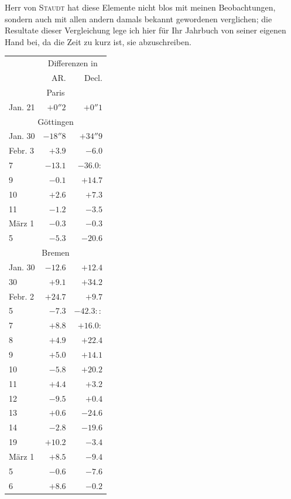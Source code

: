 Herr von \textsc{Staudt} hat diese Elemente nicht blos mit meinen Beobachtungen, sondern auch mit allen andern damals bekannt gewordenen verglichen; die Resultate dieser Vergleichung lege ich hier für Ihr Jahrbuch von seiner eigenen Hand bei, da die Zeit zu kurz ist, sie abzuschreiben.

\begin{center}
\begin{tabular}{l|r|r}
& \multicolumn{2}{c}{Differenzen in} \\
& AR. & Decl. \\
\multicolumn{3}{c}{Paris} \\
Jan. 21 & $+0''2$ & $+0''1$ \\
\multicolumn{3}{c}{Göttingen} \\
Jan. 30 & $-18''8$ & $+34''9$ \\
Febr. 3 & $+3.9$ & $-6.0$ \\
7 & $-13.1$ & $-36.0\!:$ \\
9 & $-0.1$ & $+14.7$ \\
10 & $+2.6$ & $+7.3$ \\
11 & $-1.2$ & $-3.5$ \\
März 1 & $-0.3$ & $-0.3$ \\
5 & $-5.3$ & $-20.6$ \\
\multicolumn{3}{c}{Bremen} \\
Jan. 30 & $-12.6$ & $+12.4$ \\
30 & $+9.1$ & $+34.2$ \\
Febr. 2 & $+24.7$ & $+9.7$ \\
5 & $-7.3$ & $-42.3\!::$ \\
7 & $+8.8$ & $+16.0\!:$ \\
8 & $+4.9$ & $+22.4$ \\
9 & $+5.0$ & $+14.1$ \\
10 & $-5.8$ & $+20.2$ \\
11 & $+4.4$ & $+3.2$ \\
12 & $-9.5$ & $+0.4$ \\
13 & $+0.6$ & $-24.6$ \\
14 & $-2.8$ & $-19.6$ \\
19 & $+10.2$ & $-3.4$ \\
März 1 & $+8.5$ & $-9.4$ \\
5 & $-0.6$ & $-7.6$ \\
6 & $+8.6$ & $-0.2$ \\
\end{tabular}
\end{center}

